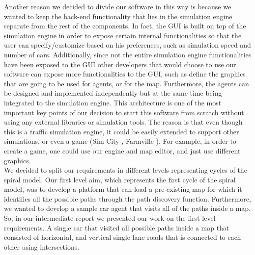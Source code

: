 \documentclass[oneside]{article}
\begin{document}
\noindent Another reason we decided to divide our software in this way is because we wanted to keep the back-end functionality that lies in the simulation engine separate from the rest of the components. In fact, the GUI is built on top of the simulation engine in order to expose certain internal functionalities so that the user can specify/customize based on his preferences, such as simulation speed and number of cars. Additionally, since not the entire simulation engine functionalities have been exposed to the GUI other developers that would choose to use our software can expose more functionalities to the GUI, such as define the graphics that are going to be used for agents, or for the map. Furthermore, the agents can be designed and implemented independently but at the same time being integrated to the simulation engine. This architecture is one of the most important key points of our decision to start this software from scratch without using any external libraries or simulation tools. The reason is that even though this is a traffic simulation engine, it could be easily extended to support other simulations, or even a game (Sim City \cite{simCity}, Farmville \cite{farmVille}). For example, in order to create a game, one could use our engine and map editor, and just use different graphics. \\

\noindent We decided to split our requirements in different levels representing cycles of the spiral model. Our first level aim, which represents the first cycle of the spiral model, was to develop a platform that can load a pre-existing map for which it identifies all the possible paths through the path discovery function. Furthermore, we wanted to develop a sample car agent that visits all of the paths inside a map. So, in our intermediate report we presented our work on the first level requirements. A single car that visited all possible paths inside a map that consisted of horizontal, and vertical single lane roads that is connected to each other using intersections. \\
\end{document}
